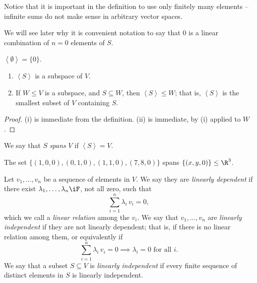 Notice that it is important in the definition to use only finitely many elements -- infinite sums do not make sense in arbitrary vector spaces.

We will see later why it is convenient notation to say that 0 is a linear combination of $n=0$ elements of $S$. 

\begin{example}
	$\left\langle \emptyset \right\rangle=\{0\}$. %
\end{example}

\begin{lemma}
\mbox{}
\begin{enumerate}
	\shortskip
	\item $\left\langle S \right\rangle$ is a subspace of $V$.
	\item If $W\leq V$ is a subspace, and $S\subseteq W$, then $\left\langle S \right\rangle\leq W$; that is, $\left\langle S \right\rangle$ is the smallest subset of $V$ containing $S$. %
\end{enumerate} %
\end{lemma}

\begin{proof}
	(i) is immediate from the definition. (ii) is immediate, by (i) applied to $W$. %
\end{proof}

\begin{definition}
	We say that $S$ \emph{spans} $V$ if $\left\langle S \right\rangle=V$. %
\end{definition}

\begin{example}
	The set $\{(1,0,0),(0,1,0),(1,1,0),(7,8,0)\}$ spans $\left\{(x,y,0)\right\}\leq \R^3$. %
\end{example}

\begin{definition}
	Let $v_1,\ldots,v_n$ be a sequence of elements in $V$. We say they are \emph{linearly dependent} if there exist $\lambda_1,\ldots,\lambda_n\iF$, not all zero, such that %
	\begin{equation*}
		\sum_{i=1}^n \lambda_i \, v_i = 0,
	\end{equation*}
	which we call a \emph{linear relation} among the $v_i$. We say that $v_1,\ldots,v_n$ are \emph{linearly independent} if they are not linearly dependent; that is, if there is no linear relation among them, or equivalently if %
	\begin{equation*}
		\sum_{i=1}^n \lambda_i \, v_i = 0 \implies \lambda_i = 0 \text{ for all } i. %
	\end{equation*}
	We say that a subset $S\subseteq V$ is \emph{linearly independent} if every finite sequence of distinct elements in $S$ is linearly independent. %
\end{definition}

